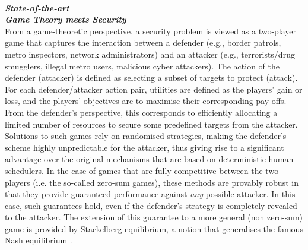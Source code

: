 \noindent \textbf{\textit{\\State-of-the-art}}
\noindent \textbf{\textit{\\Game Theory meets Security}}\\
From a game-theoretic perspective, a security problem is viewed as a two-player game that captures the interaction between a defender (e.g., border patrols, metro inspectors, network administrators) and an attacker (e.g., terrorists/drug smugglers, illegal metro users, malicious cyber attackers). The action of the defender (attacker) is defined as selecting a subset of targets to protect (attack). For each defender/attacker action pair, utilities are defined as the players' gain or loss, and the players' objectives are to maximise their corresponding pay-offs. From the defender's perspective, this corresponds to efficiently allocating a limited number of resources to secure some predefined targets from the attacker. 
Solutions to such games rely on randomised strategies, making the defender's scheme highly unpredictable for the attacker, thus giving rise to a significant advantage over the original mechanisms that are based on deterministic human schedulers. In the case of games that are fully competitive between the two players  (i.e. the so-called zero-sum games), these methods are provably robust in that they provide guaranteed performance against {\em any} possible attacker. In this case, such guarantees hold, even if the defender's strategy is completely revealed to the attacker.  
The extension of this guarantee to a more general (non zero-sum) game is provided by Stackelberg equilibrium, a notion that generalises the famous Nash equilibrium \cite{korzhyk2011stackelberg}. 

